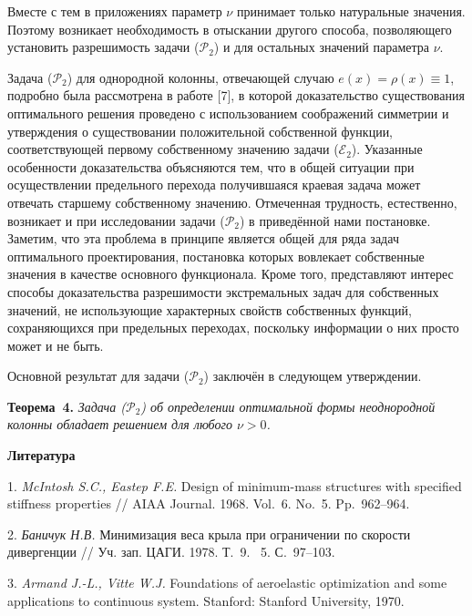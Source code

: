 %
%
%
Вместе с тем в приложениях параметр $\nu$ принимает только натуральные значения.
%
%
%
Поэтому возникает необходимость в отыскании другого способа,
позволяющего установить разрешимость задачи ($\mathcal{P}_2$) и для остальных значений параметра $\nu$.
%
%
%
%
%
\par
Задача ($\mathcal{P}_2$) для однородной колонны, отвечающей случаю $e(x) = \rho(x) \equiv 1$,
подробно была рассмотрена в работе [7],
в которой
доказательство существования оптимального решения проведено с использованием
соображений симметрии
и
утверждения о существовании положительной собственной функции, соответствующей первому собственному значению
задачи ($\mathcal{E}_2$).
%
%
%
Указанные особенности доказательства объясняются тем,
что в общей ситуации
при осуществлении предельного перехода получившаяся краевая задача
может отвечать старшему собственному значению.
%
%
%
Отмеченная трудность, естественно, возникает и при исследовании задачи
($\mathcal{P}_2$) в приведённой нами постановке.
%
%
%
Заметим, что эта проблема в принципе является общей для ряда задач оптимального проектирования,
постановка которых вовлекает собственные значения в качестве основного функционала.
%
%
%
Кроме того,
представляют интерес способы доказательства разрешимости
экстремальных задач для собственных значений,
не использующие характерных свойств собственных функций,
сохраняющихся при предельных переходах,
поскольку информации о них просто может и не быть.
%
%
%
%
%
\par
Основной результат для задачи ($\mathcal{P}_2$) заключён в
следующем утверждении.

\textbf{Теорема~4.} {\it Задача \emph{($\mathcal{P}_2$)} об определении оптимальной формы неоднородной колонны обладает решением для любого $\nu > 0$.}
%
%
%
\par



\smallskip \centerline {\bf Литература} \nopagebreak

1. {\it McIntosh S.C., Eastep F.E.}
Design of minimum-mass structures with specified stiffness properties
// AIAA Journal. 1968. Vol.~6. No.~5. Pp.~962\nobreakdash--964.

2. {\it Баничук Н.В.}
Минимизация веса крыла при ограничении по скорости дивергенции
// Уч. зап. ЦАГИ. 1978. Т.~9. \textnumero~5. С.~97\nobreakdash--103.

3. {\it Armand J.-L., Vitte W.J.}
Foundations of aeroelastic
\linebreak
optimization and some applications to continuous system.
\linebreak
Stanford: Stanford University, 1970.



